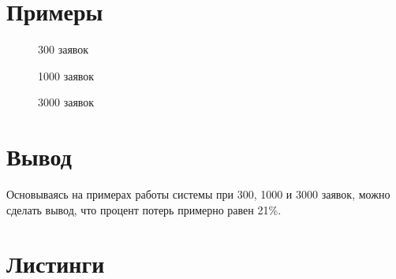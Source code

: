 \documentclass[14pt, a4paper]{extarticle}
\begin{document}
	\clearpage
	\section*{Примеры}
	
	\begin{figure}[h!]
		\centering\caption{300 заявок}
	\end{figure}


	\begin{figure}[h!]
		\centering\caption{1000 заявок}
	\end{figure}
	
	\begin{figure}[h!]
		\centering\caption{3000 заявок}
	\end{figure}
	
	\section*{Вывод}
	Основываясь на примерах работы системы при 300, 1000 и 3000 заявок, можно сделать вывод, что процент потерь 
	примерно равен 21\%.
	
	
	\clearpage
	\section*{Листинги}
	
\end{document}
